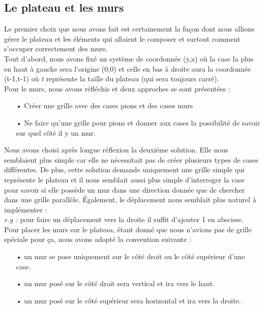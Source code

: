 \documentclass[a4paper, 12pt]{article}
\begin{document}
\subsection{Le plateau et les murs}
Le premier choix que nous avons fait est certainement la façon dont nous allions gérer le plateau et les éléments qui allaient le composer et surtout comment s'occuper correctement
des murs. \\
Tout d'abord, nous avons fixé un système de coordonnée (y,x) où la case la plus en haut à gauche sera l'origine (0,0) et celle en bas à droite aura la coordonnée (t-1,t-1) où \textit{t} représente la taille du plateau (qui sera toujours carré). \\
Pour le murs, nous avons réfléchis et deux approches se sont présentées : 
\begin{itemize}
\item[•] Créer une grille avec des cases pions et des cases murs
\item[•] Ne faire qu'une grille pour pions et donner aux cases la possibilité de savoir sur quel côté il y un mur.
\end{itemize}
Nous avons choisi après longue réflexion la deuxième solution. Elle nous semblaient plus simple car elle ne nécessitait pas de créer plusieurs types de cases différentes. De plus, cette solution demande uniquement une grille simple qui représente le plateau et il nous semblait aussi plus simple d'interroger la case pour savoir si elle possède un mur dans une direction donnée que de chercher dans une grille parallèle. Également, le déplacement nous semblait plus naturel à implémenter : \\
\textit{e.g :} pour faire un déplacement vers la droite il suffit d'ajouter 1 en abscisse. \\
Pour placer les murs sur le plateau, étant donné que nous n'avions pas de grille spéciale pour ça, nous avons adopté la convention suivante : \\
\begin{itemize}
\item[•] un mur se pose uniquement sur le côté droit ou le côté supérieur d'une case.
\item[•] un mur posé sur le côté droit sera vertical et ira vers le haut.
\item[•] un mur posé sur le côté supérieur sera horizontal et ira vers la droite.
\end{itemize}
\end{document}
